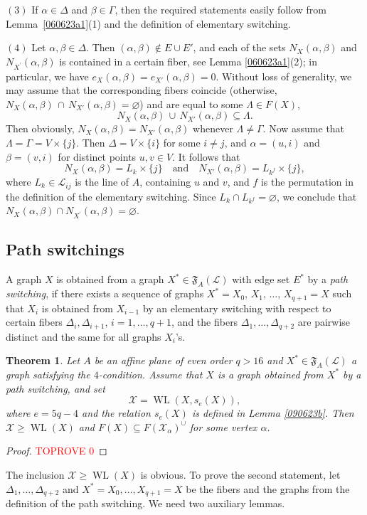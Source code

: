 \documentclass{amsart}
\newcommand{\cal}{\mathcal}
\newtheorem{theorem}[formula]{Theorem}
\def\thrml#1{\begin{theorem}\label{#1}}
\def\ethrm{\end{theorem}}
\def\qtnl#1{\begin{equation}\label{#1}}
\def\eqtn{\end{equation}}
\def\prf{\begin{proof}\textcolor{red}{TOPROVE 0}\end{proof}}
\def\cL{{\cal L}}
\def\cX{{\cal X}}
\def\fF{{\mathfrak F}}
\DeclareMathOperator{\WL}{WL}
\def\qaq{\quad\text{and}\quad}
\begin{document}
$(3)$ If $\alpha\in\Delta$  and $\beta\in \Gamma$, then the required statements easily follow from  Lemma~\ref{060623a1}(1) and the definition of elementary switching.

$(4)$ Let $\alpha,\beta\in\Delta$. Then  $(\alpha,\beta)\not\in E\cup E'$, and each of the sets $N_{X^{}}(\alpha,\beta)$ and $N_{X^{'}}(\alpha,\beta)$ is contained in a certain fiber, see Lemma \ref{060623a1}(2); in particular, we have $e_{X^{}}(\alpha,\beta)=e_{X'}(\alpha,\beta)=0$.  Without loss of generality, we may assume that the corresponding fibers coincide 
(otherwise, $N_{X}(\alpha,\beta)\,\cap\,N_{X'}(\alpha,\beta)=\varnothing$) and are equal to some $\Lambda\in F(X)$,
$$
N_{X}(\alpha,\beta)\,\cup\,N_{X'}(\alpha,\beta)\subseteq\Lambda.
$$
 Then obviously, $N_{X}(\alpha,\beta)=N_{X'}(\alpha,\beta)$ whenever $\Lambda\ne\Gamma$. Now assume that $\Lambda=\Gamma=V\times\{j\}$.  Then  $\Delta=V\times \{i\}$ for some $i\ne j$, and $\alpha=(u,i)$ and $\beta=(v,i)$ for distinct points $u,v\in V$. It follows that 
 $$
 N_{X^{}}(\alpha,\beta)=L_{k^{}}\times \{j\}\qaq  N_{X'}(\alpha,\beta)=L_{k^f}\times \{j\},
 $$ 
 where $L_{k^{}}\in\cL^{}_{ij}$  is the line of $A$, containing $u$ and $v$, and  $f$ is the permutation in the definition of the elementary switching. Since $L_{k^{}}\cap L_{k^f}=\varnothing$, we conclude that $N_{X^{}}(\alpha,\beta)\cap N_{X^{'}}(\alpha,\beta)=\varnothing$.  
\eprf

\subsection{Path switchings}

A graph $X$ is obtained from a graph $X^*\in\fF_A(\cL)$ 
with edge set $E^*$ by a \emph{path switching}, if there exists a sequence of graphs $X^*=X_0$, $X_1$, $\ldots$, $X_{q+1}=X$ such that $X_i$ is obtained from $X_{i-1}$ by an elementary switching with respect to certain fibers $\Delta_i,\Delta_{i+1}$, $i=1,\ldots,q+1$, and the fibers $\Delta_1,\ldots,\Delta_{q+2}$ are pairwise distinct and 
the same for all graphs $X_i$'s. 

\thrml{080623a}
Let $A$ be an affine plane of even order $q>16$ and $X^*\in\fF_A(\cL)$ a graph satisfying the $4$-condition. Assume that $X$  is a graph obtained from  $X^*$ by a path switching, and set 
\qtnl{050723a}
\cX=\WL(X,s_e(X)),
\eqtn
 where $e=5q-4$ and the relation $s_e(X)$ is defined 
 in Lemma \ref{090623b}. 
 Then  $\cX\ge \WL(X)$ and $F(X)\subseteq F(\cX_\alpha)^\cup$ 
 for some vertex $\alpha$.
\ethrm
\prf
The inclusion $\cX\ge \WL(X)$  is obvious. To prove the second statement, let $\Delta_1,\ldots,\Delta_{q+2}$ and  $X^*=X_0,\ldots, X_{q+1}=X$ be the fibers and the graphs from the definition 
of the path switching. We need two auxiliary lemmas.
\end{document}
